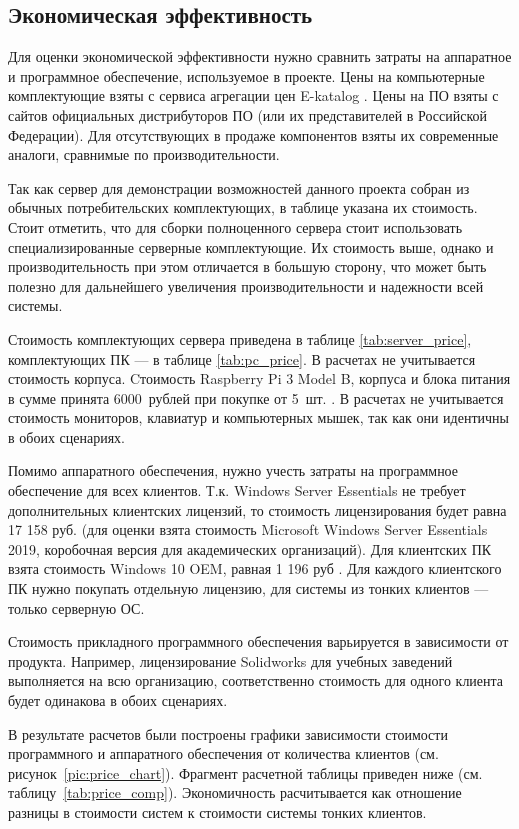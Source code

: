 \subsection{Экономическая эффективность}

Для оценки экономической эффективности нужно сравнить затраты на аппаратное и
программное обеспечение, используемое в проекте. Цены на компьютерные комплектующие
взяты с сервиса агрегации цен E-katalog \cite{ref:eeekatalog}. Цены на ПО взяты с сайтов
официальных дистрибуторов ПО (или их представителей в Российской Федерации).  Для
отсутствующих в продаже компонентов взяты их современные аналоги, сравнимые по
производительности.

Так как сервер для демонстрации возможностей данного проекта собран из обычных
потребительских комплектующих, в таблице указана их стоимость. Стоит отметить, что для
сборки полноценного сервера стоит использовать специализированные серверные 
комплектующие. Их стоимость выше, однако и производительность при этом отличается в
большую сторону, что может быть полезно для дальнейшего увеличения производительности и
надежности всей системы.

Стоимость комплектующих сервера приведена в таблице \ref{tab:server_price},
комплектующих ПК — в таблице \ref{tab:pc_price}. В расчетах не учитывается стоимость
корпуса. Cтоимость Raspberry Pi 3 Model B, корпуса и блока питания в сумме принята
6000~рублей при покупке от 5~шт. \cite{ref:raspberry_price}. В расчетах не учитывается
стоимость мониторов, клавиатур и компьютерных мышек, так как они идентичны в обоих
сценариях.

Помимо аппаратного обеспечения, нужно учесть затраты на программное обеспечение для всех
клиентов. Т.к. Windows Server Essentials не требует дополнительных клиентских лицензий,
то стоимость лицензирования будет равна 17 158 руб. (для оценки взята стоимость
Microsoft Windows Server Essentials 2019, коробочная версия для академических
организаций). Для клиентских ПК взята стоимость Windows 10 OEM, равная 1 196 руб
\cite{ref:windows_price}. Для каждого клиентского ПК нужно покупать отдельную лицензию,
для системы из тонких клиентов — только серверную ОС.

Стоимость прикладного программного обеспечения варьируется в зависимости от продукта.
Например, лицензирование Solidworks для учебных заведений выполняется на всю
организацию, соответственно стоимость для одного клиента будет одинакова в обоих
сценариях.

В результате расчетов были построены графики зависимости стоимости программного и
аппаратного обеспечения от количества клиентов (см. рисунок~\ref{pic:price_chart}).
Фрагмент расчетной таблицы приведен ниже (см. таблицу~\ref{tab:price_comp}).
Экономичность расчитывается как отношение разницы в стоимости систем к стоимости системы
тонких клиентов.

